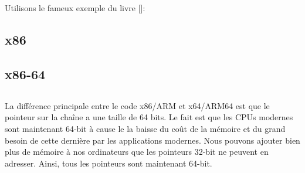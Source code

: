 \section{\HelloWorldSectionName}
\label{sec:helloworld}

Utilisons le fameux exemple du livre [\KRBook]:



\subsection{x86}





\subsection{x86-64}








\subsection{\Conclusion{}}

La différence principale entre le code x86/ARM et x64/ARM64 est que le pointeur sur la chaîne a une taille de 64 bits.
Le fait est que les \ac{CPU}s modernes sont maintenant 64-bit à cause le la baisse du coût de la mémoire et du grand
besoin de cette dernière par les applications modernes.
Nous pouvons ajouter bien plus de mémoire à nos ordinateurs que les pointeurs 32-bit ne peuvent en adresser.
Ainsi, tous les pointeurs sont maintenant 64-bit.



